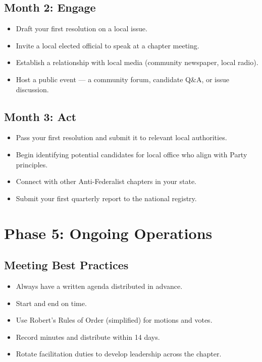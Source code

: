 \documentclass[11pt, letterpaper]{article}
\begin{document}
\subsection{Month 2: Engage}
\begin{itemize}
  \item Draft your first resolution on a local issue.
  \item Invite a local elected official to speak at a chapter meeting.
  \item Establish a relationship with local media (community newspaper, local radio).
  \item Host a public event --- a community forum, candidate Q\&A, or issue discussion.
\end{itemize}

\subsection{Month 3: Act}
\begin{itemize}
  \item Pass your first resolution and submit it to relevant local authorities.
  \item Begin identifying potential candidates for local office who align with Party principles.
  \item Connect with other Anti-Federalist chapters in your state.
  \item Submit your first quarterly report to the national registry.
\end{itemize}


\section{Phase 5: Ongoing Operations}

\subsection{Meeting Best Practices}
\begin{itemize}
  \item Always have a written agenda distributed in advance.
  \item Start and end on time.
  \item Use Robert's Rules of Order (simplified) for motions and votes.
  \item Record minutes and distribute within 14 days.
  \item Rotate facilitation duties to develop leadership across the chapter.
\end{itemize}
\end{document}
